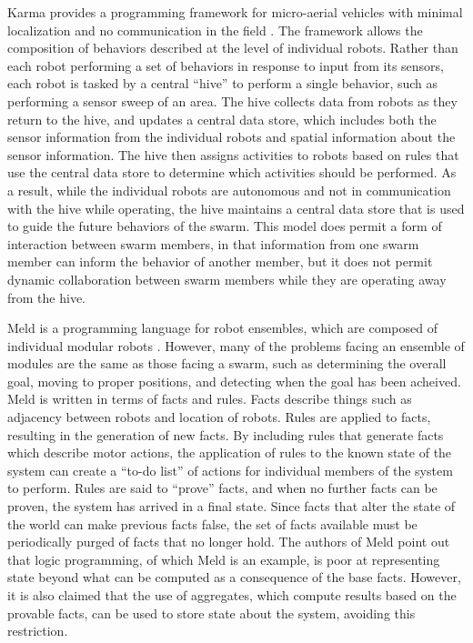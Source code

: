 Karma provides a programming framework for micro-aerial vehicles with minimal localization and no communication in the field \citep{dantu2011programming}.
The framework allows the composition of behaviors described at the level of individual robots. 
Rather than each robot performing a set of behaviors in response to input from its sensors, each robot is tasked by a central ``hive'' to perform a single behavior, such as performing a sensor sweep of an area. 
The hive collects data from robots as they return to the hive, and updates a central data store, which includes both the sensor information from the individual robots and spatial information about the sensor information. 
The hive then assigns activities to robots based on rules that use the central data store to determine which activities should be performed. 
As a result, while the individual robots are autonomous and not in communication with the hive while operating, the hive maintains a central data store that is used to guide the future behaviors of the swarm. 
This model does permit a form of interaction between swarm members, in that information from one swarm member can inform the behavior of another member, but it does not permit dynamic collaboration between swarm members while they are operating away from the hive. 

Meld is a programming language for robot ensembles, which are composed of individual modular robots \citep{ashley2007meld}. 
However, many of the problems facing an ensemble of modules are the same as those facing a swarm, such as determining the overall goal, moving to proper positions, and detecting when the goal has been acheived. 
Meld is written in terms of facts and rules. 
Facts describe things such as adjacency between robots and location of robots. 
Rules are applied to facts, resulting in the generation of new facts. 
By including rules that generate facts which describe motor actions, the application of rules to the known state of the system can create a ``to-do list'' of actions for individual members of the system to perform. 
Rules are said to ``prove'' facts, and when no further facts can be proven, the system has arrived in a final state. 
Since facts that alter the state of the world can make previous facts false, the set of facts available must be periodically purged of facts that no longer hold. 
The authors of Meld point out that logic programming, of which Meld is an example, is poor at representing state beyond what can be computed as a consequence of the base facts. 
However, it is also claimed that the use of aggregates, which compute results based on the provable facts, can be used to store state about the system, avoiding this restriction. 

